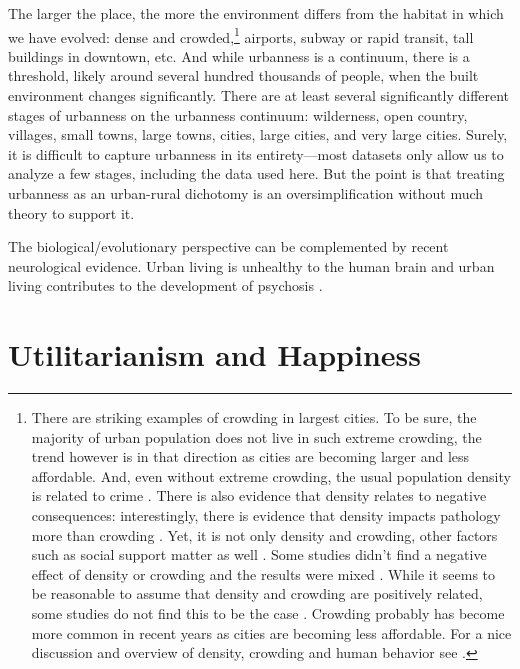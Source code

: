 \documentclass[10pt, letterpaper]{article}
\begin{document}
The larger the place, the more the environment differs from the habitat in which we have evolved: dense and crowded,\footnote{There are striking examples of crowding in largest cities.  To be sure, the majority of urban population does not live in such extreme crowding, the trend however is in that direction as cities are becoming larger and less affordable. And, even without extreme crowding, the usual population density is related to crime \citep{bettencourt10b}. There is also evidence that density relates to negative consequences: interestingly, there is evidence that density impacts pathology more than crowding \citep{levy1974effects}. Yet, it is not only density and crowding, other factors such as social support matter as well \citep{cassel2017health}. Some studies didn't find a negative effect of density or crowding and the results were mixed \citep{collette1976urban}. While it seems to be reasonable to assume that density and crowding are positively related, some studies do not find this to be the case \citep{webb1975meaning,rodgers1982density}. Crowding probably has become more common in recent years as cities are becoming less affordable. \citet{misraCL15oct6,floridaCL18apr11,weinbergCL16aug11,solariMISC19apr24,schuetzMISC19may7,kotkin_db_mar20_13}
 For a nice discussion and overview of density, crowding and human behavior see \citet{boots1979population,choldin1978urban}.}
airports, subway or rapid transit, tall buildings in downtown, etc. And while urbanness is a continuum, there is a threshold, likely around several hundred thousands of people, when the built environment changes significantly.
%
 There are at least several significantly different stages of urbanness on the
 urbanness continuum: wilderness, open country, villages, small towns, large towns, cities, large
 cities, and very large cities. Surely, it is difficult to capture urbanness in
 its entirety---most datasets only allow us to analyze a few stages, including the data used
 here. But the point is that treating urbanness as an urban-rural dichotomy \citep[][]{glaeser11,burger20} is an
 oversimplification without much theory to support it.

The biological/evolutionary perspective can be complemented by recent neurological evidence. Urban living is unhealthy to the human brain \citep{lederbogen11} and urban living contributes to the development of psychosis \citep{abrahamyan20}.
 
\section*{Utilitarianism and Happiness} %
\end{document}

